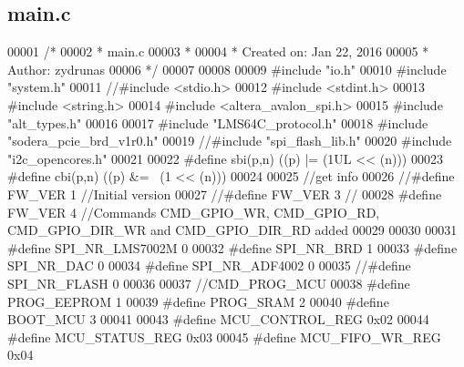 \subsection{main.\+c}
\label{main_8c_source}

\begin{DoxyCode}
00001 \textcolor{comment}{/*}
00002 \textcolor{comment}{ * main.c}
00003 \textcolor{comment}{ *}
00004 \textcolor{comment}{ *  Created on: Jan 22, 2016}
00005 \textcolor{comment}{ *      Author: zydrunas}
00006 \textcolor{comment}{ */}
00007 
00008 
00009 \textcolor{preprocessor}{#include "io.h"}
00010 \textcolor{preprocessor}{#include "system.h"}
00011 \textcolor{comment}{//#include <stdio.h>}
00012 \textcolor{preprocessor}{#include <stdint.h>}
00013 \textcolor{preprocessor}{#include <string.h>}
00014 \textcolor{preprocessor}{#include <altera_avalon_spi.h>}
00015 \textcolor{preprocessor}{#include "alt_types.h"}
00016 
00017 \textcolor{preprocessor}{#include "LMS64C_protocol.h"}
00018 \textcolor{preprocessor}{#include "sodera_pcie_brd_v1r0.h"}
00019 \textcolor{comment}{//#include "spi\_flash\_lib.h"}
00020 \textcolor{preprocessor}{#include "i2c_opencores.h"}
00021 
00022 \textcolor{preprocessor}{#define sbi(p,n) ((p) |= (1UL << (n)))}
00023 \textcolor{preprocessor}{#define cbi(p,n) ((p) &= ~(1 << (n)))}
00024 
00025 \textcolor{comment}{//get info}
00026 \textcolor{comment}{//#define FW\_VER                1 //Initial version}
00027 \textcolor{comment}{//#define FW\_VER                3 //}
00028 \textcolor{preprocessor}{#define FW\_VER              4 //Commands CMD\_GPIO\_WR, CMD\_GPIO\_RD, CMD\_GPIO\_DIR\_WR and CMD\_GPIO\_DIR\_RD
       added}
00029 
00030 
00031 \textcolor{preprocessor}{#define SPI\_NR\_LMS7002M 0}
00032 \textcolor{preprocessor}{#define SPI\_NR\_BRD      1}
00033 \textcolor{preprocessor}{#define SPI\_NR\_DAC      0}
00034 \textcolor{preprocessor}{#define SPI\_NR\_ADF4002  0}
00035 \textcolor{comment}{//#define SPI\_NR\_FLASH    0}
00036 
00037 \textcolor{comment}{//CMD\_PROG\_MCU}
00038 \textcolor{preprocessor}{#define PROG\_EEPROM 1}
00039 \textcolor{preprocessor}{#define PROG\_SRAM   2}
00040 \textcolor{preprocessor}{#define BOOT\_MCU    3}
00041 
00043 \textcolor{preprocessor}{#define MCU\_CONTROL\_REG 0x02}
00044 \textcolor{preprocessor}{#define MCU\_STATUS\_REG  0x03}
00045 \textcolor{preprocessor}{#define MCU\_FIFO\_WR\_REG 0x04}

\end{DoxyCode}
